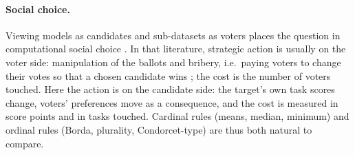 \paragraph{Social choice.}
Viewing models as candidates and sub-datasets as voters places the question in computational social choice \citep{brandt2016handbook}. In that literature, strategic action is usually on the voter side: manipulation of the ballots \citep{bartholdi1989computational} and bribery, i.e.\ paying voters to change their votes so that a chosen candidate wins \citep{faliszewski2009bribery}; the cost is the number of voters touched. Here the action is on the candidate side: the target's own task scores change, voters' preferences move as a consequence, and the cost is measured in score points and in tasks touched. Cardinal rules (means, median, minimum) and ordinal rules (Borda, plurality, Condorcet-type) are thus both natural to compare.

